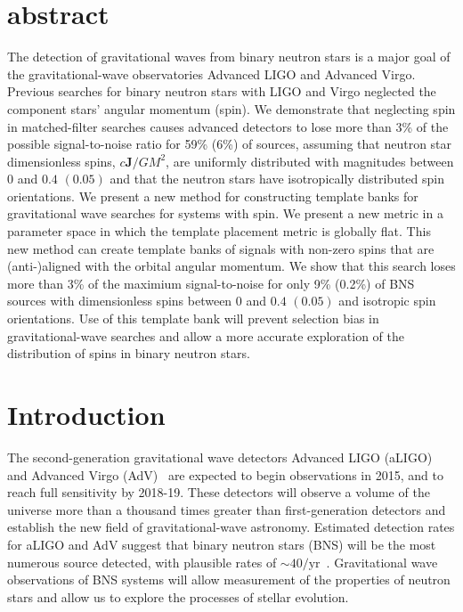 

\section{abstract}
The detection of gravitational waves from binary neutron stars
is a major goal of the gravitational-wave observatories Advanced LIGO and
Advanced Virgo. Previous searches for binary neutron stars with LIGO and Virgo
neglected the component stars' angular momentum (spin).  We demonstrate that
neglecting spin in matched-filter searches causes advanced detectors
to lose more than 3\% of the possible signal-to-noise ratio for 59\% (6\%) of
sources, assuming that neutron star dimensionless spins, $c\mathbf{J}/GM^2$, are uniformly distributed
with magnitudes between $0$ and $0.4$ $(0.05)$ and that the neutron stars
have isotropically distributed spin orientations.
We present a new method for constructing template banks for gravitational
wave searches for systems with spin. We present a new metric in a parameter
space in which the template placement metric is globally flat.
This new method can create template banks of signals with
non-zero spins that are (anti-)aligned with the orbital angular momentum.  We show that this search loses more than
3\% of the maximium signal-to-noise for only 9\% (0.2\%) of BNS sources with dimensionless spins between $0$ and $0.4$ $(0.05)$ and isotropic spin orientations. Use of this
template bank will prevent selection bias in gravitational-wave searches and
allow a more accurate exploration of the distribution of spins in binary
neutron stars.

\maketitle

\section{Introduction}

The second-generation gravitational wave detectors Advanced LIGO (aLIGO) and
Advanced Virgo (AdV)~\cite{Harry:2010zz, aVirgo} are expected to begin
observations in 2015, and to reach full sensitivity by 2018-19. These detectors
will observe a volume of the universe more than a thousand times greater than
first-generation detectors and establish the new field of gravitational-wave
astronomy. Estimated detection rates for aLIGO and AdV suggest that binary
neutron stars (BNS) will be the most numerous source detected, with plausible
rates of $\sim 40/\mathrm{yr}$~\cite{Abadie:2010cf}.
Gravitational wave
observations of BNS systems will allow measurement of the properties of
neutron stars and allow us to explore the processes of stellar evolution.

